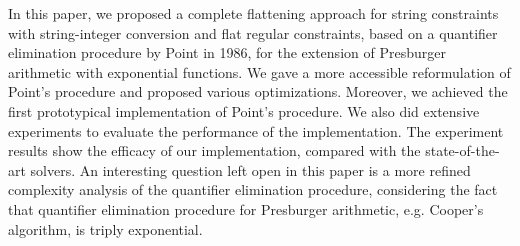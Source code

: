 
In this paper, we proposed a complete flattening approach for string constraints with string-integer conversion and flat regular constraints, based on a quantifier elimination procedure by Point in 1986, for the extension of Presburger arithmetic with exponential functions. We gave a more accessible reformulation of Point's procedure and proposed various optimizations. Moreover, we achieved the first prototypical implementation of Point's procedure. We also did extensive experiments to evaluate the performance of the implementation. The experiment results show the efficacy of our implementation, compared with the state-of-the-art solvers. An interesting question left open in this paper is a more refined complexity analysis of the quantifier elimination procedure, considering the fact that quantifier elimination procedure for Presburger arithmetic, e.g. Cooper's algorithm, is triply exponential. 
